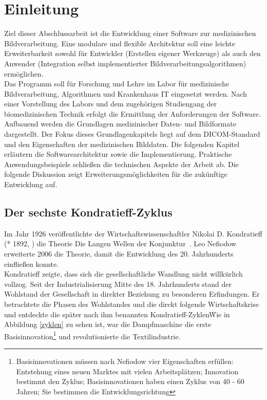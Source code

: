 \chapter{Einleitung}\label{einleitung}

Ziel dieser Abschlussarbeit ist die Entwicklung einer Software zur medizinischen Bildverarbeitung. Eine modulare und flexible Architektur soll eine leichte Erweiterbarkeit sowohl für Entwickler (Erstellen eigener Werkzeuge) als auch den Anwender (Integration selbst implementierter Bildverarbeitungsalgorithmen) ermöglichen.\\
Das Programm soll für Forschung und Lehre im Labor für medizinische Bildverarbeitung, Algorithmen und Krankenhaus IT eingesetzt werden. Nach einer Vorstellung des Labors und dem zugehörigen Studiengang der biomedizinischen Technik erfolgt die Ermittlung der Anforderungen der Software. Aufbauend werden die Grundlagen medizinischer Daten- und Bildformate dargestellt. Der Fokus dieses Grundlagenkapitels liegt auf dem DICOM-Standard und den Eigenschaften der medizinischen Bilddaten. Die folgenden Kapitel erläutern die Softwarearchitektur sowie die Implementierung. Praktische Anwendungsbeispiele schließen die technischen Aspekte der Arbeit ab. Die folgende Diskussion zeigt Erweiterungsmöglichkeiten für die zukünftige Entwicklung auf.

\section{Der sechste Kondratieff-Zyklus}
Im Jahr 1926 veröffentlichte der Wirtschaftswissenschaftler Nikolai D. Kondratieff (* 1892, ) die Theorie \glqq Die Langen Wellen der Konjunktur\grqq\ \cite{hensen:gesundeGesellschaft}.
Leo Nefiodow erweiterte 2006 die Theorie, damit die Entwicklung des 20. Jahrhunderts einfließen konnte.\\
Kondratieff zeigte, dass sich die gesellschaftliche Wandlung nicht willkürlich vollzog. Seit der Industrialisierung Mitte des 18. Jahrhunderts stand der Wohlstand der Gesellschaft in direkter Beziehung zu besonderen Erfindungen. Er betrachtete die Phasen des Wohlstandes und die direkt folgende Wirtschaftskrise und entdeckte die später nach ihm benannten \glqq Kondratieff-Zyklen\grqq\.
Wie in Abbildung \ref{zyklen} zu sehen ist, war die Dampfmaschine die erste Basisinnovation\footnote{Basisinnovationen müssen nach Nefiodow vier Eigenschaften erfüllen: Entstehung eines neuen Marktes mit vielen Arbeitsplätzen; Innovation bestimmt den Zyklus; Basisinnovationen haben einen Zyklus von 40 - 60 Jahren; Sie bestimmen die Entwicklungsrichtung} und revolutionierte die Textilindustrie.\cite{wieden:liquidwork}

